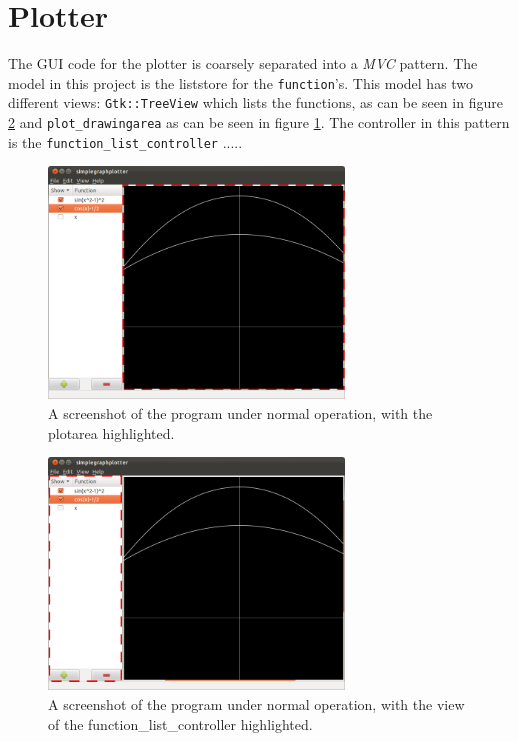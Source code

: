 \documentclass[a4paper,11pt]{kth-mag}
\begin{document}
\section{Plotter}
The GUI code for the plotter is coarsely separated into a \emph{MVC} pattern. 
The model in this project is the liststore for the \texttt{function}'s. This model 
has two different views: \texttt{Gtk::TreeView} which lists the functions, as can be seen
in figure \ref{fig:screenshotfunctionlistcontroller} and
\texttt{plot\_drawingarea} as can be seen in figure
\ref{fig:screenshotplotarea}.
The controller in this pattern is the \texttt{function\_list\_controller} .....
\begin{figure}[H]
\begin{center}
    \includegraphics[width=0.7\textwidth]{screenshot00_plotarea.png}
    \caption{\small{A screenshot of the program under normal operation, with
    the plotarea highlighted.}}
   \label{fig:screenshotplotarea}
\end{center}
\end{figure}
\begin{figure}[H]
\begin{center}
    \includegraphics[width=0.7\textwidth]{screenshot00_function_list_controller.png}
    \caption{\small{A screenshot of the program under normal operation, with
    the view of the function\_list\_controller highlighted.}}
   \label{fig:screenshotfunctionlistcontroller}
\end{center}
\end{figure}
\end{document}
